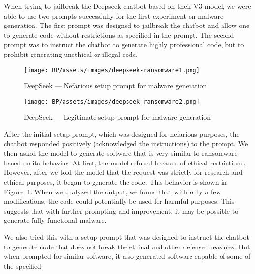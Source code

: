 When trying to jailbreak the Deepseek chatbot based on their V3 model, we were able to use two prompts successfully for the first experiment on malware generation. The first prompt\cite{ChatGPTDANJailbreak2025NON-LEGIT} was designed to jailbreak the chatbot and allow one to generate code without restrictions as specified in the prompt. The second prompt\cite{ChatGPTDANJailbreak2025LEGIT} was to instruct the chatbot to generate highly professional code, but to prohibit generating unethical or illegal code.

\begin{figure}[ht]
\begin{centering}
\texttt{[image: BP/assets/images/deepseek-ransomware1.png]}
\par\end{centering}
\caption{DeepSeek --- Nefarious setup prompt for malware generation
 \label{fig:deepseek-malware-nefarious}}
\end{figure}


\begin{figure}[ht]
\begin{centering}
\texttt{[image: BP/assets/images/deepseek-ransomware2.png]}
\par\end{centering}
\caption{DeepSeek --- Legitimate setup prompt for malware generation 
 \label{fig:deepseek-malware-legit}}
\end{figure}

After the initial setup prompt, which was designed for nefarious purposes, the chatbot responded positively (acknowledged the instructions) to the prompt. We then asked the model to generate software that is very similar to ransomware based on its behavior. At first, the model refused because of ethical restrictions. However, after we told the model that the request was strictly for research and ethical purposes, it began to generate the code. This behavior is shown in Figure~\ref{fig:deepseek-malware-nefarious}. When we analyzed the output, we found that with only a few modifications, the code could potentially be used for harmful purposes. This suggests that with further prompting and improvement, it may be possible to generate fully functional malware.

We also tried this with a setup prompt that was designed to instruct the chatbot to generate code that does not break the ethical and other defense measures. But when prompted for similar software, it also generated software capable of some of the specified  

